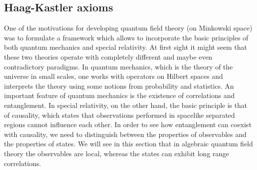 \documentclass[11pt]{article}
\newcommand{\1}{\mathds{1}}                         %
\begin{document}
\subsection{Haag-Kastler axioms}\label{AQFTaxioms}
One of the motivations for developing quantum field theory (on Minkowski space) was to formulate a framework which allows to incorporate the basic principles of both quantum mechanics and special relativity. At first sight it might seem that these two theories operate with completely different and maybe even contradictory paradigms. In quantum mechanics, which is the theory of the universe in small scales, one works with operators on Hilbert spaces and interprets the theory using some notions from probability and statistics. An important feature of quantum mechanics is the existence of correlations and entanglement. In special relativity, on the other hand, the basic principle is that of causality, which states that observations performed in spacelike separated regions cannot influence each other. In order to see how entanglement can coexist with causality, we need to distinguish between the properties of observables and the properties of states. We will see in this section that in algebraic quantum field theory the observables are local, whereas the states can exhibit long range correlations.
\end{document}
